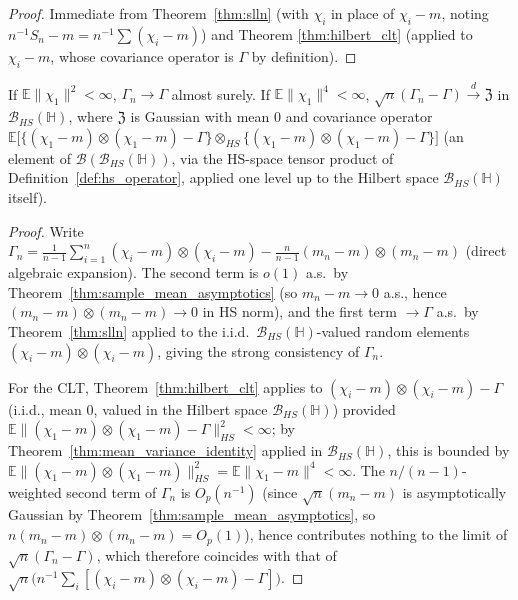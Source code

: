 \begin{proof}
Immediate from Theorem~\ref{thm:slln} (with $\chi_i$ in place of $\chi_i-m$,
noting $n^{-1}S_n-m = n^{-1}\sum(\chi_i-m)$) and Theorem
\ref{thm:hilbert_clt} (applied to $\chi_i-m$, whose covariance operator is
$\Gamma$ by definition).
\end{proof}

\begin{theorem}
\label{thm:sample_covariance_asymptotics}
If $\mathbb{E}\|\chi_1\|^2<\infty$, $\Gamma_n\to\Gamma$ almost surely. If
$\mathbb{E}\|\chi_1\|^4<\infty$, $\sqrt{n}(\Gamma_n-\Gamma)\xrightarrow{d}
\mathfrak{Z}$ in $\mathcal{B}_{HS}(\mathbb{H})$, where $\mathfrak{Z}$ is
Gaussian with mean $0$ and covariance operator $\mathbb{E}\big[\{(\chi_1-m)
\otimes(\chi_1-m)-\Gamma\}\otimes_{HS}\{(\chi_1-m)\otimes(\chi_1-m)-\Gamma\}
\big]$ (an element of $\mathcal{B}(\mathcal{B}_{HS}(\mathbb{H}))$, via the
HS-space tensor product of Definition~\ref{def:hs_operator}, applied one
level up to the Hilbert space $\mathcal{B}_{HS}(\mathbb{H})$ itself).
\end{theorem}

\begin{proof}
Write $\Gamma_n = \frac{1}{n-1}\sum_{i=1}^n(\chi_i-m)\otimes(\chi_i-m) -
\frac{n}{n-1}(m_n-m)\otimes(m_n-m)$ (direct algebraic expansion). The
second term is $o(1)$ a.s.\ by Theorem~\ref{thm:sample_mean_asymptotics}
(so $m_n-m\to0$ a.s., hence $(m_n-m)\otimes(m_n-m)\to0$ in HS norm), and
the first term $\to\Gamma$ a.s.\ by Theorem~\ref{thm:slln} applied to the
i.i.d.\ $\mathcal{B}_{HS}(\mathbb{H})$-valued random elements $(\chi_i-m)
\otimes(\chi_i-m)$, giving the strong consistency of $\Gamma_n$.

For the CLT, Theorem~\ref{thm:hilbert_clt} applies to $(\chi_i-m)\otimes
(\chi_i-m)-\Gamma$ (i.i.d., mean $0$, valued in the Hilbert space
$\mathcal{B}_{HS}(\mathbb{H})$) provided $\mathbb{E}\|(\chi_1-m)\otimes
(\chi_1-m)-\Gamma\|_{HS}^2<\infty$; by Theorem~\ref{thm:mean_variance_identity}
applied in $\mathcal{B}_{HS}(\mathbb{H})$, this is bounded by $\mathbb{E}
\|(\chi_1-m)\otimes(\chi_1-m)\|_{HS}^2 = \mathbb{E}\|\chi_1-m\|^4<\infty$.
The $n/(n-1)$-weighted second term of $\Gamma_n$ is $O_p(n^{-1})$ (since
$\sqrt{n}(m_n-m)$ is asymptotically Gaussian by
Theorem~\ref{thm:sample_mean_asymptotics}, so $n(m_n-m)\otimes(m_n-m) =
O_p(1)$), hence contributes nothing to the limit of $\sqrt{n}(\Gamma_n-
\Gamma)$, which therefore coincides with that of $\sqrt{n}\big(n^{-1}
\sum_i[(\chi_i-m)\otimes(\chi_i-m)-\Gamma]\big)$.
\end{proof}

